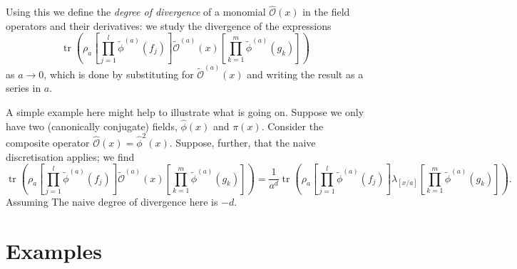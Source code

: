 \documentclass[prl,twocolumn,lengthcheck,superscriptaddress]{revtex4-1}
\newcommand{\tr}{\operatorname{tr}}
\theoremstyle{definition}
\theoremstyle{remark}
\begin{document}
Using this we define the \emph{degree of divergence} of a monomial $\widehat{\mathcal{O}}(x)$ in the field operators and their derivatives: we study 
the divergence of the expressions 
\begin{equation}
	\tr\left(\rho_a \left[\prod_{j=1}^l\widetilde{\phi}^{(a)}(f_j)\right] \widetilde{\mathcal{O}}^{(a)}(x) \left[\prod_{k=1}^m\widetilde{\phi}^{(a)}(g_k)\right]\right)
\end{equation}
as $a\rightarrow 0$, which is done by substituting for $\widetilde{\mathcal{O}}^{(a)}(x)$ and writing the result as a series in $a$.

A simple example here might help to illustrate what is going on. Suppose we only have two (canonically conjugate) fields, $\widehat{\phi}(x)$ and $\pi(x)$. Consider the composite operator $\widehat{\mathcal{O}}(x) = \widehat{\phi}^2(x)$. Suppose, further, that the naive discretisation applies; we find
\begin{equation}
	\tr\left(\rho_a \left[\prod_{j=1}^l\widetilde{\phi}^{(a)}(f_j)\right] \widetilde{\mathcal{O}}^{(a)}(x) \left[\prod_{k=1}^m\widetilde{\phi}^{(a)}(g_k)\right]\right) = \frac{1}{a^d} \tr\left(\rho_a \left[\prod_{j=1}^l\widetilde{\phi}^{(a)}(f_j)\right] \lambda_{[x/a]} \left[\prod_{k=1}^m\widetilde{\phi}^{(a)}(g_k)\right]\right).
\end{equation}
Assuming 
The naive degree of divergence here is $-d$.


\section{Examples}
\end{document}
